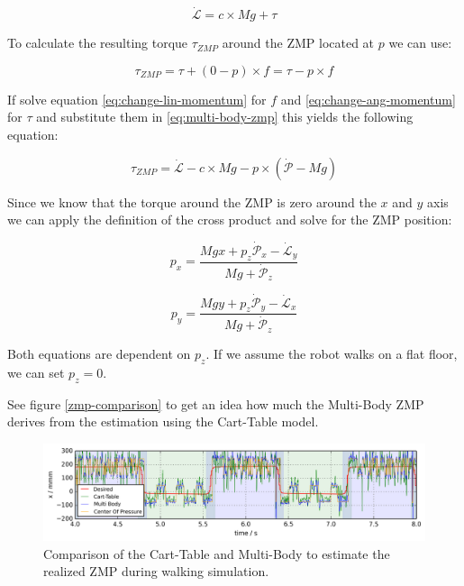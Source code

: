\documentclass[english,ngerman]{KITreprt}
\begin{document}
\begin{equation} \label{eq:change-ang-momentum}
\dot{\mathcal{L}} = c \times Mg + \tau
\end{equation}

To calculate the resulting torque $\tau_{ZMP}$ around the ZMP located at
$p$ we can use:

\begin{equation} \label{eq:multi-body-zmp}
\tau_{ZMP} = \tau + (0 - p) \times f = \tau - p \times f
\end{equation}

If solve equation \ref{eq:change-lin-momentum} for $f$ and
\ref{eq:change-ang-momentum} for $\tau$ and substitute them in
\ref{eq:multi-body-zmp} this yields the following equation:

\begin{equation}
\tau_{ZMP} = \dot{\mathcal{L}} - c \times M g - p \times (\dot{\mathcal{P}} - Mg)
\end{equation}

Since we know that the torque around the ZMP is zero around the $x$ and
$y$ axis we can apply the definition of the cross product and solve for
the ZMP position:

\begin{equation}
p_x = \frac{Mgx + p_z \dot{\mathcal{P}}_x - \dot{\mathcal{L}}_y}{Mg + \dot{\mathcal{P}}_z}
\end{equation}

\begin{equation}
p_y = \frac{Mgy + p_z \dot{\mathcal{P}}_y - \dot{\mathcal{L}}_x}{Mg + \dot{\mathcal{P}}_z}
\end{equation}

Both equations are dependent on $p_z$. If we assume the robot walks on a
flat floor, we can set $p_z = 0$.

See figure \ref{zmp-comparison} to get an idea how much the Multi-Body
ZMP derives from the estimation using the Cart-Table model.

\begin{figure}[tb]
\includegraphics[width=\textwidth,resolution=300]{images/zmp_comparison.png}
\caption{Comparison of the Cart-Table and Multi-Body to estimate the realized ZMP during walking simulation.}
\label{img:zmp-comparison}
\end{figure}
\end{document}
